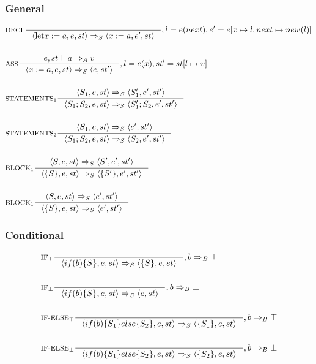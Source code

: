 \subsubsection{General}
\begin{align*}
&\inference[$\text{DECL}$]{}
                         {\Braket{\Tlet x := a,e,st} \Rightarrow_S \Braket{x := a, e',st}}
												{, l = e(next), e' = e[x\mapsto l, next\mapsto new(l)]}
\\\\
&\inference[$\text{ASS}$]{e,st \vdash a \Rightarrow_A v}
                         {\Braket{x := a,e,st} \Rightarrow_S \Braket{e,st'}}
												{, l = e(x), st' = st[l\mapsto v]}
\\\\
&\inference[$\text{STATEMENTS}_1$]{\Braket{S_1,e,st} \Rightarrow_S \Braket{S_1',e',st'}}
                         {\Braket{S_1;S_2,e,st} \Rightarrow_S \Braket{S_1';S_2,e',st'}}
\\\\
&\inference[$\text{STATEMENTS}_2$]{\Braket{S_1,e,st} \Rightarrow_S \Braket{e',st'}}
                         {\Braket{S_1;S_2,e,st} \Rightarrow_S \Braket{S_2,e',st'}}
\\\\
&\inference[$\text{BLOCK}_1$]{\Braket{S,e,st} \Rightarrow_S \Braket{S',e',st'}}
                         {\Braket{\{S\},e,st} \Rightarrow_S \Braket{\{S'\},e',st'}}
\\\\
&\inference[$\text{BLOCK}_1$]{\Braket{S,e,st} \Rightarrow_S \Braket{e',st'}}
                         {\Braket{\{S\},e,st} \Rightarrow_S \Braket{e',st'}}
\end{align*}

\subsubsection{Conditional}
\newcommand{\Tif}{\text{if}}
\newcommand{\Telse}{\text{else}}

\begin{align*}
&\inference[$\text{IF}_\top$]{}
                      {\Braket{if(b)\{S\},e,st} \Rightarrow_S \Braket{\{S\},e,st}}
											{,b \Rightarrow_B \top}
\\\\
&\inference[$\text{IF}_\bot$]{}
                      {\Braket{if(b)\{S\},e,st} \Rightarrow_S \Braket{e,st}}
											{,b \Rightarrow_B \bot}
\\\\
&\inference[$\text{IF-ELSE}_\top$]{}
                      {\Braket{if(b)\{S_1\}else\{S_2\},e,st} \Rightarrow_S \Braket{\{S_1\},e,st}}
											{,b \Rightarrow_B \top}
\\\\
&\inference[$\text{IF-ELSE}_\bot$]{}
                      {\Braket{if(b)\{S_1\}else\{S_2\},e,st} \Rightarrow_S \Braket{\{S_2\},e,st}}
											{,b \Rightarrow_B \bot}
\end{align*}
